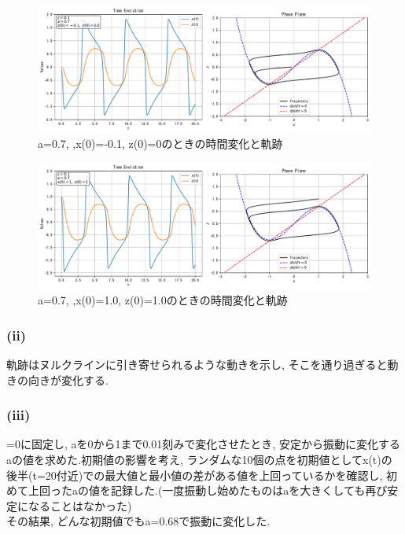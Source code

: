 \documentclass[11pt]{ltjsarticle}
\begin{document}
        \begin{figure}[H]
          \centering
          \includegraphics[width=0.98\columnwidth]{plot_7.pdf}
          \caption{a=0.7, ,x(0)=-0.1, z(0)=0のときの時間変化と軌跡}
        \end{figure} 
        \begin{figure}[H]
          \centering
          \includegraphics[width=0.98\columnwidth]{plot_8.pdf}
          \caption{a=0.7, ,x(0)=1.0, z(0)=1.0のときの時間変化と軌跡}
        \end{figure}
      \subsubsection*{(ii)}
        軌跡はヌルクラインに引き寄せられるような動きを示し, そこを通り過ぎると動きの向きが変化する.
      \subsubsection*{(iii)}
        \epsilon=0に固定し, aを0から1まで0.01刻みで変化させたとき, 安定から振動に変化するaの値を求めた.初期値の影響を考え, ランダムな10個の点を初期値としてx(t)の後半(t=20付近)での最大値と最小値の差がある値を上回っているかを確認し, 初めて上回ったaの値を記録した.(一度振動し始めたものはaを大きくしても再び安定になることはなかった)\\
        その結果, どんな初期値でもa=0.68で振動に変化した.\\
\end{document}
